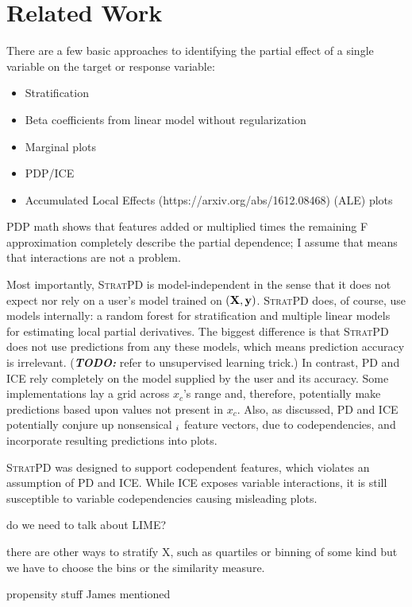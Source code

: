 \documentclass[12pt]{article}
\newcommand{\todo}[1]{{\bf\em TODO:} {{#1}}}
\newcommand{\spd}{\fontfamily{cmr}\textsc{\small StratPD}}
\begin{document}
\section{Related Work}

There are a few basic approaches to identifying the partial effect of a single variable on the target or response variable:

\begin{itemize}
\item Stratification
\item Beta coefficients from linear model without regularization
\item Marginal plots
\item PDP/ICE
\item Accumulated Local Effects (https://arxiv.org/abs/1612.08468) (ALE) plots
\end{itemize}

PDP math shows that features added or multiplied times the remaining F approximation completely describe the partial dependence; I assume that means that interactions are not a problem.

Most importantly, \spd{} is model-independent in the sense that it does not expect nor rely on a user's model trained on $({\bf X}, {\bf y})$.  \spd{} does, of course, use models internally: a random forest for stratification and multiple linear models for estimating local partial derivatives.  The biggest difference is that \spd{} does not use predictions from any these models, which means prediction accuracy is irrelevant.  (\todo{refer to unsupervised learning trick}.)  In contrast, PD and ICE rely completely on the model supplied by the user and its accuracy.  Some implementations lay a grid across $x_c$'s range and, therefore, potentially make predictions based upon values not present in $x_c$. Also, as discussed, PD and ICE potentially conjure up nonsensical ${\bf }_i$ feature vectors, due to codependencies, and incorporate resulting predictions into plots.

\spd{} was designed to support codependent features, which violates an assumption of PD and ICE. While ICE exposes variable interactions, it is still susceptible to variable codependencies causing misleading plots.

do we need to talk about LIME?

there are other ways to stratify X, such as quartiles or binning of some kind but we have to choose the bins or the similarity measure.

propensity stuff James mentioned
\end{document}
